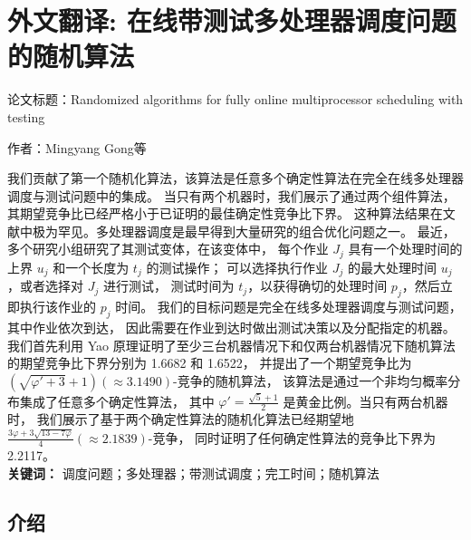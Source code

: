 
\newrefsection

\chapter{外文翻译: 在线带测试多处理器调度问题的随机算法}

论文标题：Randomized algorithms for fully online multiprocessor scheduling with testing

作者：Mingyang Gong等


我们贡献了第一个随机化算法，该算法是任意多个确定性算法在完全在线多处理器调度与测试问题中的集成。
当只有两个机器时，我们展示了通过两个组件算法，其期望竞争比已经严格小于已证明的最佳确定性竞争比下界。
这种算法结果在文献中极为罕见。多处理器调度是最早得到大量研究的组合优化问题之一。
最近，多个研究小组研究了其测试变体，在该变体中，
每个作业 \( J_j \) 具有一个处理时间的上界 \( u_j \) 和一个长度为 \( t_j \) 的测试操作；
可以选择执行作业 \( J_j \) 的最大处理时间 \( u_j \)，或者选择对 \( J_j \) 进行测试，
测试时间为 \( t_j \)，以获得确切的处理时间 \( p_j \)，然后立即执行该作业的 \( p_j \) 时间。
我们的目标问题是完全在线多处理器调度与测试问题，其中作业依次到达，
因此需要在作业到达时做出测试决策以及分配指定的机器。
我们首先利用 Yao 原理证明了至少三台机器情况下和仅两台机器情况下随机算法的期望竞争比下界分别为 1.6682 和 1.6522，
并提出了一个期望竞争比为 \( (\sqrt{\varphi' + 3} + 1)(\approx 3.1490) \)-竞争的随机算法，
该算法是通过一个非均匀概率分布集成了任意多个确定性算法，
其中 \( \varphi' = \frac{\sqrt{5}+1}{2} \) 是黄金比例。当只有两台机器时，
我们展示了基于两个确定性算法的随机化算法已经期望地 \( \frac{3\varphi + 3\sqrt{13 - 7\varphi}}{4}(\approx2.1839)\)-竞争，
同时证明了任何确定性算法的竞争比下界为 2.2117。\\
\textbf{关键词：} 调度问题；多处理器；带测试调度；完工时间；随机算法

\section{介绍}

